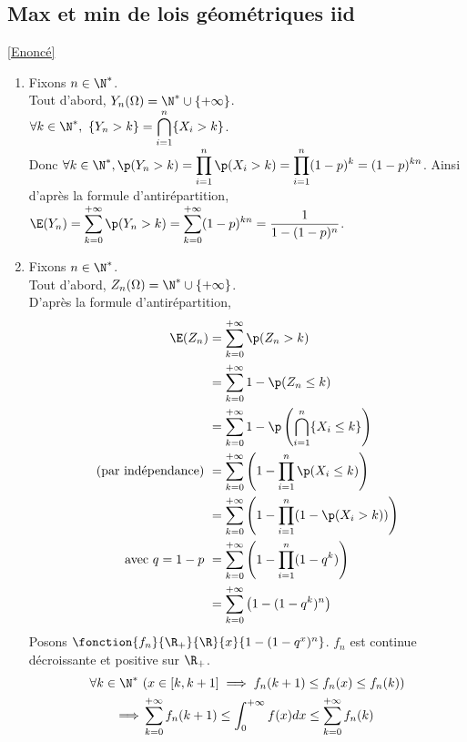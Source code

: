 \documentclass[8pt]{book}
\begin{document}
	\subsection{Max et min de lois géométriques iid }
	\label{Max et min de lois géométriques iid corrigé}
		\textcolor{blue}{\hyperref[Max et min de lois géométriques iid]{[Enoncé]}}\\
	\begin{enumerate}
		\item Fixons $n\in \N^*$.\\
		Tout d'abord, $Y_n(\Omega)=\N^*\cup\{+\infty\}$.\\
		$\forall k\in \N^*,\ \{Y_n>k\}=\displaystyle\bigcap\limits_{i=1}^n\{X_i>k\}$.\\
		Donc $\forall k\in \N^*, \p(Y_n>k)=\displaystyle\prod\limits_{i=1}^n\p(X_i>k)=\prod\limits_{i=1}^n(1-p)^k=(1-p)^{kn}$. Ainsi d'après la formule d'antirépartition,\\
		$\E(Y_n)=\displaystyle\sum\limits_{k=0}^{+\infty}\p(Y_n>k)=\sum\limits_{k=0}^{+\infty}(1-p)^{kn}=\frac{1}{1-(1-p)^n}$.
		\item Fixons $n\in \N^*$.\\
		Tout d'abord, $Z_n(\Omega)=\N^*\cup\{+\infty\}$.\\
		D'après la formule d'antirépartition,\begin{align*}
			\E(Z_n)&=\sum\limits_{k=0}^{+\infty}\p(Z_n>k)\\
			&=\sum\limits_{k=0}^{+\infty}1-\p(Z_n\leq k)\\
			&=\sum\limits_{k=0}^{+\infty}1-\p\left(\bigcap\limits_{i=1}^n\{X_i\leq k\}\right)\\
			\text{(par indépendance) }&=\sum\limits_{k=0}^{+\infty}\left(1-\prod\limits_{i=1}^n\p(X_i\leq k)\right)\\
			&=\sum\limits_{k=0}^{+\infty}\left(1-\prod\limits_{i=1}^n(1-\p(X_i>k))\right)\\
			\text{avec }q=1-p\ &=\sum\limits_{k=0}^{+\infty}\left(1-\prod\limits_{i=1}^n(1-q^k)\right)\\
			&=\sum\limits_{k=0}^{+\infty}\left(1-(1-q^k)^n\right)\\
		\end{align*}
		Posons $\fonction{f_n}{\R_+}{\R}{x}{1-(1-q^x)^n}$. $f_n$ est continue décroissante et positive sur $\R_+$.
		\begin{align*}
			\forall k\in \N^*\ &(x\in [k,k+1]\implies f_n(k+1)\leq f_n(x)\leq f_n(k))\\
			\implies &\sum\limits_{k=0}^{+\infty}f_n(k+1)\leq\int_0^{+\infty}f(x)dx\leq\sum\limits_{k=0}^{+\infty}f_n(k)\\

\end{align*}
\end{enumerate}
\end{document}
